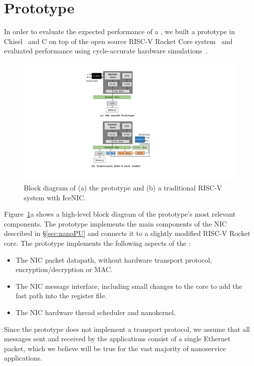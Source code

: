 \section{\name{} Prototype}
\label{sec:prototype}
In order to evaluate the expected performance of a \name{}, we built a prototype in Chisel~\cite{chisel} and C on top of the open source RISC-V Rocket Core system~\cite{rocket-chip} and evaluated performance using cycle-accurate hardware simulations~\cite{verilator}.

\begin{figure}
  \includegraphics[width=0.9\linewidth]{./figures/prototype}
  \caption{Block diagram of (a) the \name{} prototype and (b) a traditional RISC-V system with IceNIC.}
  \label{fig:prototype}
\end{figure}


Figure~\ref{fig:prototype}a shows a high-level block diagram of the prototype's most relevant components.
The prototype implements the main components of the NIC described in \S\ref{sec:nanoPU} and connects it to a slightly modified RISC-V Rocket core.
The prototype implements the following aspects of the \name{}:
\begin{itemize}[topsep=0.4\baselineskip, leftmargin=20pt]
    \item The NIC packet datapath, without hardware transport protocol, encryption/decryption or MAC.
    \item The NIC message interface, including small changes to the core to add the fast path into the register file.
    \item The NIC hardware thread scheduler and nanokernel.
\end{itemize}
Since the prototype does not implement a transport protocol, we assume that all messages sent and received by the applications consist of a single Ethernet packet, which we believe will be true for the vast majority of nanoservice applications.

